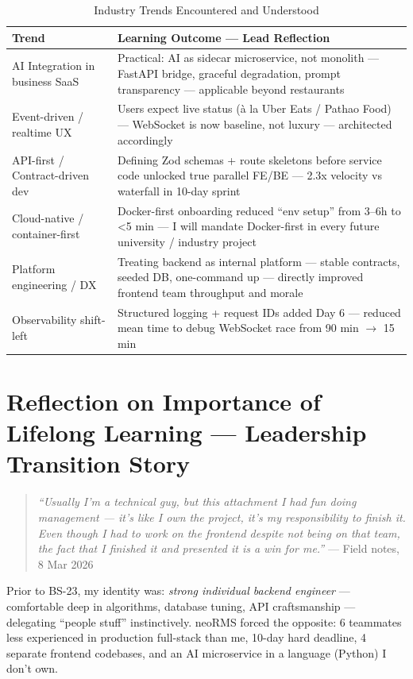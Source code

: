\begin{table}[H]
\centering
\caption{Industry Trends Encountered and Understood}
\label{tab:trends}
\begin{tabularx}{\textwidth}{@{}p{}X@{}}
\toprule
\textbf{Trend} & \textbf{Learning Outcome --- Lead Reflection} \\
\midrule
AI Integration in business SaaS & Practical: AI as sidecar microservice, not monolith --- FastAPI bridge, graceful degradation, prompt transparency --- applicable beyond restaurants \\
Event-driven / realtime UX & Users expect live status (\`a la Uber Eats / Pathao Food) --- WebSocket is now baseline, not luxury --- architected accordingly \\
API-first / Contract-driven dev & Defining Zod schemas + route skeletons before service code unlocked true parallel FE/BE --- 2.3x velocity vs waterfall in 10-day sprint \\
Cloud-native / container-first & Docker-first onboarding reduced ``env setup'' from 3--6h to <5 min --- I will mandate Docker-first in every future university / industry project \\
Platform engineering / DX & Treating backend as internal platform --- stable contracts, seeded DB, one-command up --- directly improved frontend team throughput and morale \\
Observability shift-left & Structured logging + request IDs added Day 6 --- reduced mean time to debug WebSocket race from 90 min $\rightarrow$ 15 min \\
\bottomrule
\end{tabularx}
\end{table}

\section{Reflection on Importance of Lifelong Learning --- Leadership Transition Story}

\begin{quote}
\textit{``Usually I'm a technical guy, but this attachment I had fun doing management --- it's like I own the project, it's my responsibility to finish it. Even though I had to work on the frontend despite not being on that team, the fact that I finished it and presented it is a win for me.''} --- Field notes, 8 Mar 2026
\end{quote}

Prior to BS-23, my identity was: \textit{strong individual backend engineer} --- comfortable deep in algorithms, database tuning, API craftsmanship --- delegating ``people stuff'' instinctively. neoRMS forced the opposite: 6 teammates less experienced in production full-stack than me, 10-day hard deadline, 4 separate frontend codebases, and an AI microservice in a language (Python) I don't own.

